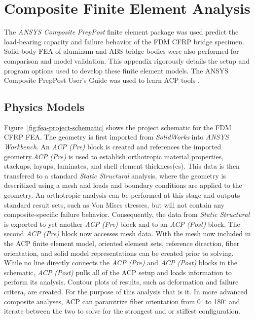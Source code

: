 \section{Composite Finite Element Analysis}

\indent

The \textit{ANSYS Composite PrepPost} finite element package was used predict the load-bearing capacity and failure behavior of the FDM CFRP bridge specimen. Solid-body FEA of aluminum and ABS bridge bodies were also performed for comparison and model validation. This appendix rigorously details the setup and program options used to develop these finite element models. The ANSYS Composite PrepPost User's Guide was used to learn ACP tools \cite{ACP-manual}.\\

\subsection{Physics Models}

\indent

Figure~\ref{fig:fea-project-schematic} shows the project schematic for the FDM CFRP FEA. The geometry is first imported from \emph{SolidWorks} into \emph{ANSYS Workbench}. An \textit{ACP (Pre)} block is created and references the imported geometry.\textit{ACP (Pre)} is used to establish orthotropic material properties, stackups, layups, laminates, and shell element thickness(es). This data is then transfered to a standard \textit{Static Structural} analysis, where the geometry is descritized using a mesh and loads and boundary conditions are applied to the geometry. An orthotropic analysis can be performed at this stage and outputs standard result sets, such as Von Mises stresses, but will not contain any composite-specific failure behavior. Consequently, the data from \textit{Static Structural} is exported to yet another \textit{ACP (Pre)} block and to an \textit{ACP (Post)} block. The second \textit{ACP (Pre)} block now accesses mesh data. With the mesh now included in the ACP finite element model, oriented element sets, reference direction, fiber orientation, and solid model representations can be created prior to solving. While no line directly connects the \textit{ACP (Pre)} and \textit{ACP (Post)} blocks in the schematic, \textit{ACP (Post)} pulls all of the ACP setup and loads information to perform its analysis. Contour plots of results, such as deformation and failure critera, are created. For the purpose of this analysis that is it. In more advanced composite analyses, ACP can paramtrize fiber orientation from 0$^{\circ}$ to 180$^{\circ}$ and iterate between the two to solve for the strongest and or stiffest configuration.\\

